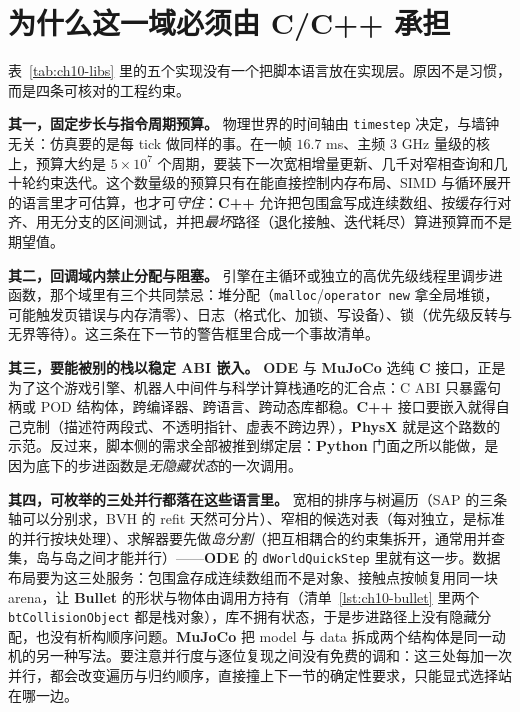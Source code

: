 \documentclass[12pt,a4paper,fontset=fandol]{ctexbook}
\newcommand{\Tp}[1]{\texttt{#1}}
\newcommand{\Bk}{\allowbreak}
\newcommand{\Lib}[1]{\textbf{#1}}
\newcommand{\Lang}[1]{\textsf{\bfseries #1}}
\newcommand{\CL}{\Lang{C}}
\newcommand{\CPP}{\Lang{C++}}
\newcommand{\PY}{\Lang{Python}}
\begin{document}
\section{为什么这一域必须由 C/C++ 承担}

表~\ref{tab:ch10-libs} 里的五个实现没有一个把脚本语言放在实现层。原因不是习惯，而是四条可核对的工程约束。

\textbf{其一，固定步长与指令周期预算。} 物理世界的时间轴由 \Tp{timestep} 决定，与墙钟无关：仿真要的是每 tick 做同样的事。在一帧 $16.7$ ms、主频 $3$ GHz 量级的核上，预算大约是 $5\times 10^{7}$ 个周期，要装下一次宽相增量更新、几千对窄相查询和几十轮约束迭代。这个数量级的预算只有在能直接控制内存布局、SIMD 与循环展开的语言里才可估算，也才可\emph{守住}：\CPP{} 允许把包围盒写成连续数组、按缓存行对齐、用无分支的区间测试，并把\emph{最坏}路径（退化接触、迭代耗尽）算进预算而不是期望值。

\textbf{其二，回调域内禁止分配与阻塞。} 引擎在主循环或独立的高优先级线程里调步进函数，那个域里有三个共同禁忌：堆分配（\Tp{malloc}/{\Bk}\Tp{operator new} 拿全局堆锁，可能触发页错误与内存清零）、日志（格式化、加锁、写设备）、锁（优先级反转与无界等待）。这三条在下一节的警告框里合成一个事故清单。

\textbf{其三，要能被别的栈以稳定 ABI 嵌入。} \Lib{ODE} 与 \Lib{MuJoCo} 选纯 \CL{} 接口，正是为了这个游戏引擎、机器人中间件与科学计算栈通吃的汇合点：C ABI 只暴露句柄或 POD 结构体，跨编译器、跨语言、跨动态库都稳。\CPP{} 接口要嵌入就得自己克制（描述符两段式、不透明指针、虚表不跨边界），\Lib{PhysX} 就是这个路数的示范。反过来，脚本侧的需求全部被推到绑定层：\PY{} 门面之所以能做，是因为底下的步进函数是\emph{无隐藏状态}的一次调用。

\textbf{其四，可枚举的三处并行都落在这些语言里。} 宽相的排序与树遍历（SAP 的三条轴可以分别求，BVH 的 refit 天然可分片）、窄相的候选对表（每对独立，是标准的并行按块处理）、求解器要先做\emph{岛分割}（把互相耦合的约束集拆开，通常用并查集，岛与岛之间才能并行）——\Lib{ODE} 的 \Tp{dWorld\Bk Quick\Bk Step} 里就有这一步。数据布局要为这三处服务：包围盒存成连续数组而不是对象、接触点按帧复用同一块 arena，让 \Lib{Bullet} 的形状与物体由调用方持有（清单~\ref{lst:ch10-bullet} 里两个 \Tp{btCollisionObject} 都是栈对象），库不拥有状态，于是步进路径上没有隐藏分配，也没有析构顺序问题。\Lib{MuJoCo} 把 model 与 data 拆成两个结构体是同一动机的另一种写法。要注意并行度与逐位复现之间没有免费的调和：这三处每加一次并行，都会改变遍历与归约顺序，直接撞上下一节的确定性要求，只能显式选择站在哪一边。
\end{document}
